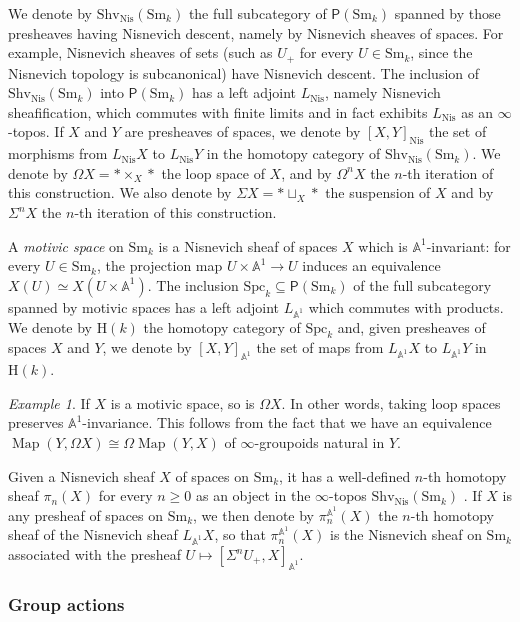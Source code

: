 \documentclass[11pt,leqno]{amsart}
\renewcommand{\1}{{\rm 1\hspace*{-0.4ex}%
\rule{0.1ex}{1.52ex}\hspace*{0.2ex}}}
\newcommand{\Nis}{{\operatorname{Nis}}}
\newcommand{\Shv}{{\mathrm{Shv}}}
\newcommand{\Sm}{\mathrm{Sm}}
\newcommand{\Spc}{\mathrm{Spc}}
\newcommand{\Hr}{{\mathrm {H}}}
\newcommand{\<}[1]{{\langle}#1 {\rangle}}
\newcommand{\Abb}{\mathbb{A}}
\newcommand{\Map}{\operatorname{Map}}
\theoremstyle{plain}
\theoremstyle{definition}
\theoremstyle{remark}
\newtheorem{ex}[thm]{Example}
\numberwithin{equation}{section}
\begin{document}
We denote by $\Shv_\Nis(\Sm_k)$ the full subcategory of $\mathsf{P}(\Sm_k)$ spanned by those presheaves having Nisnevich descent, namely by Nisnevich sheaves of spaces. For example, Nisnevich sheaves of sets (such as $U_+$ for every $U\in\Sm_k$, since the Nisnevich topology is subcanonical) have Nisnevich descent. The inclusion of $\Shv_\Nis(\Sm_k)$ into $\mathsf{P}(\Sm_k)$ has a left adjoint $L_\Nis$, namely Nisnevich sheafification, which commutes with finite limits and in fact exhibits $L_\Nis$ as an $\infty$-topos. If $X$ and $Y$ are presheaves of spaces, we denote by $[X,Y]_\Nis$ the set of morphisms from $L_\Nis X$ to $L_\Nis Y$ in the homotopy category of $\Shv_\Nis(\Sm_k)$. We denote by $\Omega X=*\times_X *$ the loop space of $X$, and by $\Omega^nX$ the $n$-th iteration of this construction. We also denote by $\Sigma X=*\sqcup_X *$ the suspension of $X$ and by $\Sigma^n X$ the $n$-th iteration of this construction.

A \emph{motivic space} on $\Sm_k$ is a Nisnevich sheaf of spaces $X$ which is $\Abb^1$-invariant: for every $U\in\Sm_k$, the projection map $U\times\Abb^1\rightarrow U$ induces an equivalence $X(U)\simeq X(U\times\Abb^1)$. The inclusion $\Spc_k\subseteq\mathsf{P}(\Sm_k)$ of the full subcategory spanned by motivic spaces has a left adjoint $L_{\Abb^1}$ which commutes with products. We denote by $\Hr(k)$ the homotopy category of $\Spc_k$ and, given presheaves of spaces $X$ and $Y$, we denote by $[X,Y]_{\Abb^1}$ the set of maps from $L_{\Abb^1}X$ to $L_{\Abb^1}Y$ in $\Hr(k)$.

\begin{ex}
If $X$ is a motivic space, so is $\Omega X$. In other words, taking loop spaces preserves $\Abb^1$-invariance. This follows from the fact that we have an equivalence $\Map(Y,\Omega X)\cong\Omega\Map(Y,X)$ of $\infty$-groupoids natural in $Y$.
\end{ex}

Given a Nisnevich sheaf $X$ of spaces on $\Sm_k$, it has a well-defined $n$-th homotopy sheaf $\pi_n(X)$ for every $n\geq 0$ as an object in the $\infty$-topos $\Shv_\Nis(\Sm_k)$ \cite[Definition 6.5.1.1]{lurieHigherToposTheory2009}. If $X$ is any presheaf of spaces on $\Sm_k$, we then denote by $\pi_n^{\Abb^1}(X)$ the $n$-th homotopy sheaf of the Nisnevich sheaf $L_{\Abb^1}X$, so that $\pi_n^{\Abb^1}(X)$ is the Nisnevich sheaf on $\Sm_k$ associated with the presheaf $U\mapsto[\Sigma^n U_+,X]_{\Abb^1}$.

\subsubsection*{Group actions}
\end{document}
